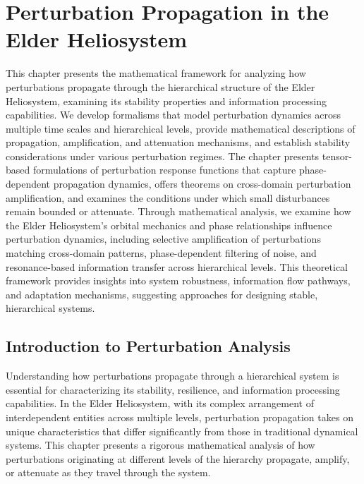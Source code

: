 \chapter{Perturbation Propagation in the Elder Heliosystem}

\begin{tcolorbox}[colback=PureBlue!5!white,colframe=PureBlue!75!black,title=Chapter Summary]
This chapter presents the mathematical framework for analyzing how perturbations propagate through the hierarchical structure of the Elder Heliosystem, examining its stability properties and information processing capabilities. We develop formalisms that model perturbation dynamics across multiple time scales and hierarchical levels, provide mathematical descriptions of propagation, amplification, and attenuation mechanisms, and establish stability considerations under various perturbation regimes. The chapter presents tensor-based formulations of perturbation response functions that capture phase-dependent propagation dynamics, offers theorems on cross-domain perturbation amplification, and examines the conditions under which small disturbances remain bounded or attenuate. Through mathematical analysis, we examine how the Elder Heliosystem's orbital mechanics and phase relationships influence perturbation dynamics, including selective amplification of perturbations matching cross-domain patterns, phase-dependent filtering of noise, and resonance-based information transfer across hierarchical levels. This theoretical framework provides insights into system robustness, information flow pathways, and adaptation mechanisms, suggesting approaches for designing stable, hierarchical systems.
\end{tcolorbox}

\section{Introduction to Perturbation Analysis}

Understanding how perturbations propagate through a hierarchical system is essential for characterizing its stability, resilience, and information processing capabilities. In the Elder Heliosystem, with its complex arrangement of interdependent entities across multiple levels, perturbation propagation takes on unique characteristics that differ significantly from those in traditional dynamical systems. This chapter presents a rigorous mathematical analysis of how perturbations originating at different levels of the hierarchy propagate, amplify, or attenuate as they travel through the system.

